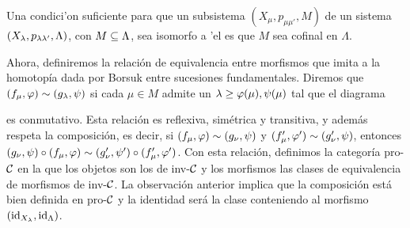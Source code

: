 \begin{observation}
    Una condici'on suficiente para que un subsistema $(X_\mu ,p_{\mu\mu' },M )$ de un sistema $(X_\lambda,p_{\lambda\lambda' },\Lambda)$, con $M\subseteq \Lambda $, sea isomorfo  a 'el es que $M$ sea cofinal en $\Lambda$.
\end{observation}
Ahora, definiremos la relación de equivalencia entre morfismos que imita a la homotopía  dada por Borsuk entre sucesiones fundamentales. Diremos que $ (f_\mu,\varphi)\sim (g_\lambda ,\psi)  $ si cada $ \mu\in M  $ admite un $ \lambda \geq \varphi(\mu),\psi(\mu )$ tal que el diagrama 
\begin{center}
\end{center}
es conmutativo. Esta relación es reflexiva, simétrica y transitiva, y además respeta la composición, es decir, si $ (f_\mu,\varphi)\sim (g_\nu,\psi ) $ y $ (f'_\mu ,\varphi' )\sim (g'_\nu,\psi) $, entonces $ (g_\nu,\psi)\circ (f_\mu,\varphi) \sim (g'_\nu ,\psi')\circ (f'_\mu,\varphi') $. Con esta relación, definimos la categoría pro-$ \mathcal{C}  $ en la que los objetos son los de inv-$\mathcal{C}  $ y los morfismos las clases de equivalencia de morfismos de inv-$ \mathcal{C}  $. La observación anterior implica que la composición está bien definida en pro-$ \mathcal{C}  $ y la identidad será la clase conteniendo al morfismo $ (\operatorname{id}_{X_\lambda },\operatorname{id}_{\Lambda }) $.

